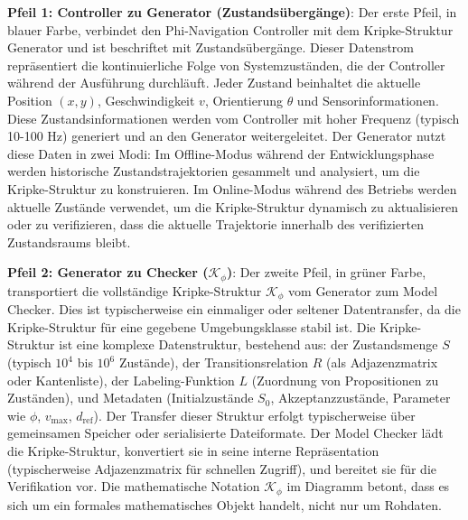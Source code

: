 ﻿\documentclass[a4paper,12pt]{article}
\theoremstyle{definition}
\begin{document}
\textbf{Pfeil 1: Controller zu Generator (Zustandsübergänge)}: Der erste Pfeil, in blauer Farbe, verbindet den Phi-Navigation Controller mit dem Kripke-Struktur Generator und ist beschriftet mit Zustandsübergänge. Dieser Datenstrom repräsentiert die kontinuierliche Folge von Systemzuständen, die der Controller während der Ausführung durchläuft. Jeder Zustand beinhaltet die aktuelle Position $(x, y)$, Geschwindigkeit $v$, Orientierung $\theta$ und Sensorinformationen. Diese Zustandsinformationen werden vom Controller mit hoher Frequenz (typisch 10-100 Hz) generiert und an den Generator weitergeleitet. Der Generator nutzt diese Daten in zwei Modi: Im Offline-Modus während der Entwicklungsphase werden historische Zustandstrajektorien gesammelt und analysiert, um die Kripke-Struktur zu konstruieren. Im Online-Modus während des Betriebs werden aktuelle Zustände verwendet, um die Kripke-Struktur dynamisch zu aktualisieren oder zu verifizieren, dass die aktuelle Trajektorie innerhalb des verifizierten Zustandsraums bleibt.

\textbf{Pfeil 2: Generator zu Checker ($\mathcal{K}_\phi$)}: Der zweite Pfeil, in grüner Farbe, transportiert die vollständige Kripke-Struktur $\mathcal{K}_\phi$ vom Generator zum Model Checker. Dies ist typischerweise ein einmaliger oder seltener Datentransfer, da die Kripke-Struktur für eine gegebene Umgebungsklasse stabil ist. Die Kripke-Struktur ist eine komplexe Datenstruktur, bestehend aus: der Zustandsmenge $S$ (typisch $10^4$ bis $10^6$ Zustände), der Transitionsrelation $R$ (als Adjazenzmatrix oder Kantenliste), der Labeling-Funktion $L$ (Zuordnung von Propositionen zu Zuständen), und Metadaten (Initialzustände $S_0$, Akzeptanzzustände, Parameter wie $\phi$, $v_{\max}$, $d_{\text{ref}}$). Der Transfer dieser Struktur erfolgt typischerweise über gemeinsamen Speicher oder serialisierte Dateiformate. Der Model Checker lädt die Kripke-Struktur, konvertiert sie in seine interne Repräsentation (typischerweise Adjazenzmatrix für schnellen Zugriff), und bereitet sie für die Verifikation vor. Die mathematische Notation $\mathcal{K}_\phi$ im Diagramm betont, dass es sich um ein formales mathematisches Objekt handelt, nicht nur um Rohdaten.
\end{document}
